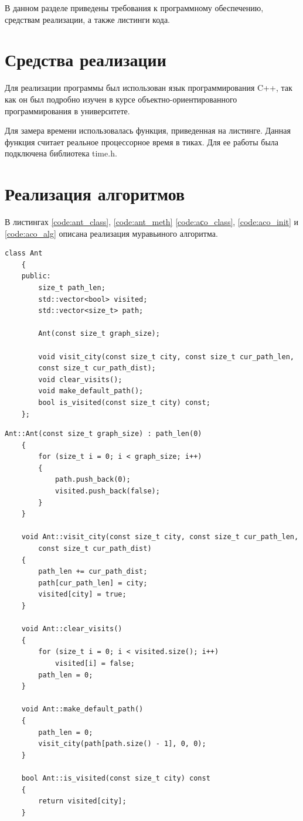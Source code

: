 \documentclass[12pt, a4paper]{report}
\begin{document}
    В данном разделе приведены требования к программному обеспечению, средствам реализации, а также листинги кода.
    
    \section{Средства реализации}
    
    Для реализации программы был использован язык программирования C++, так как он был подробно изучен в курсе объектно-ориентированного программирования в университете\cite{C}.
    
    Для замера времени использовалась функция, приведенная на листинге\cite{time_b}. Данная функция считает реальное процессорное время в тиках. Для ее работы была подключена библиотека time.h.
   
    \section{Реализация алгоритмов}
    
    В листингах \ref{code:ant_class}, \ref{code:ant_meth} \ref{code:aсo_class}, \ref{code:aco_init} и \ref{code:aco_alg} описана реализация муравьиного алгоритма.
    \begin{lstlisting}[label=code:ant_class,caption=Класс муравья Ant]
    class Ant
    {
    public:
    	size_t path_len;
    	std::vector<bool> visited;
    	std::vector<size_t> path;
    
    	Ant(const size_t graph_size);
    
    	void visit_city(const size_t city, const size_t cur_path_len,
    	const size_t cur_path_dist);
    	void clear_visits();
    	void make_default_path();
    	bool is_visited(const size_t city) const;
    };
    \end{lstlisting}
    
    \begin{lstlisting}[label=code:ant_meth,caption=Методы класса Ant]
    Ant::Ant(const size_t graph_size) : path_len(0)
    {
	    for (size_t i = 0; i < graph_size; i++)
	    {
		    path.push_back(0);
		    visited.push_back(false);
	    }
    }
    
    void Ant::visit_city(const size_t city, const size_t cur_path_len,
    	const size_t cur_path_dist)
    {
	    path_len += cur_path_dist;
	    path[cur_path_len] = city;
	    visited[city] = true;
    }
    
    void Ant::clear_visits()
    {
	    for (size_t i = 0; i < visited.size(); i++)
	    	visited[i] = false;
	    path_len = 0;
    }
    
    void Ant::make_default_path()
    {
    	path_len = 0;
    	visit_city(path[path.size() - 1], 0, 0);
    }
    
    bool Ant::is_visited(const size_t city) const
    {
    	return visited[city];
    }
    \end{lstlisting}
    
\end{document}
